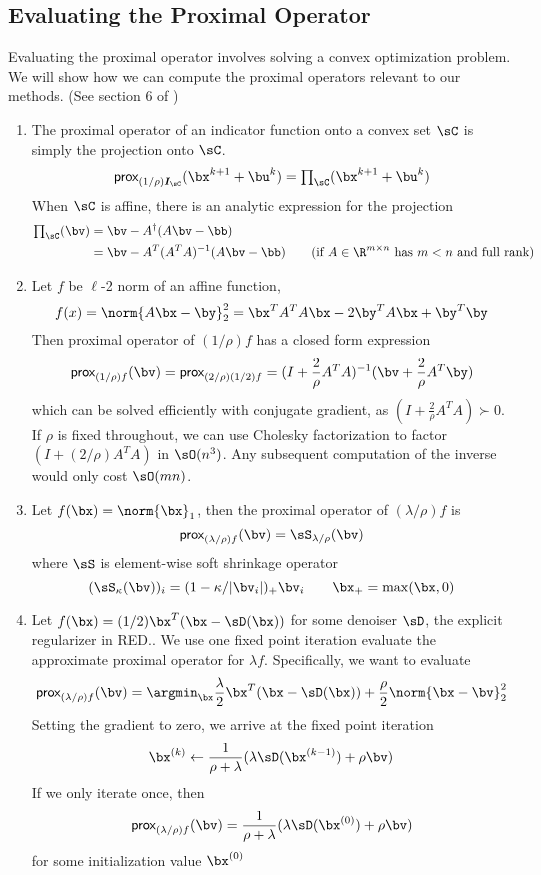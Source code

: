 \documentclass[11pt]{article}
\renewcommand{\sI}{\boldsymbol{I}}
\newcommand{\prox}{\textsf{prox}}
\begin{document}
\subsection{Evaluating the Proximal Operator}

Evaluating the proximal operator involves solving a convex optimization problem. We will show how we can compute the proximal operators relevant to our methods. (See section 6 of \cite{parikhProximalAlgorithms2014}) 
\begin{enumerate}
    \item The proximal operator of an indicator function onto a convex set $\sC$ is simply the projection onto $\sC$. 
    \[
        \prox_{(1/\rho)\sI_{\sC}}(\bx^{k+1} + \bu^k) =  \textstyle\prod_{\sC}(\bx^{k+1}+\bu^k)
    \]
    When $\sC$ is affine, there is an analytic expression for the projection
    \begin{align*}
        \textstyle\prod_{\sC}(\bv) 
            &= \bv - A^{\dagger}(A\bv-\bb)  \\
            &= \bv - A^T(A^TA)^{-1}(A\bv-\bb) \tag{if $A\in\R^{m\times n}$ has $m<n$ and full rank}
    \end{align*}
    \item Let $f$ be $\ell$-2 norm of an affine function, 
    \[
        f(x) = \norm{A\bx-\by}_2^2 = \bx^TA^TA\bx - 2\by^TA\bx + \by^T\by
    \]
    Then proximal operator of $(1/\rho)f$ has a closed form expression
    \[
        \prox_{(1/\rho)f}(\bv) 
            = \prox_{(2/\rho)(1/2)f}
            = (I + \frac{2}{\rho}A^TA)^{-1} (\bv + \frac{2}{\rho}A^T \by)
    \]
    which can be solved efficiently with conjugate gradient, as $(I + \frac{2}{\rho} A^TA) \succ 0$. If $\rho$ is fixed throughout, we can use Cholesky factorization to factor $(I + (2/\rho)A^TA)$ in $\sO(n^3)$. Any subsequent computation of the inverse would only cost $\sO(mn)$.
    \item Let $f(\bx) = \norm{\bx}_1$, then the proximal operator of $(\lambda/\rho) f$ is
    \[
        \prox_{(\lambda/\rho)f}(\bv) 
            = \sS_{\lambda/\rho}(\bv)
    \]
    where $\sS$ is element-wise soft shrinkage operator
    \[
        (\sS_{\kappa}(\bv))_i
            = (1-\kappa/|\bv_i|)_{+}\bv_i
        \quad\quad
        \bx_{+} = \max(\bx,0)
    \]
    \item Let $f(\bx) = (1/2)\bx^T(\bx-\sD(\bx))$ for some denoiser $\sD$, the explicit regularizer in RED.\cite{romanoLittleEngineThat2016}. We use one fixed point iteration evaluate the approximate proximal operator for $\lambda f$. Specifically, we want to evaluate 
    \[
        \prox_{(\lambda/\rho)f} (\bv)
            = \argmin_{\bx} \frac{\lambda}{2}\bx^T(\bx-\sD(\bx)) + \frac{\rho}{2} \norm{\bx-\bv}_2^2
    \]
    Setting the gradient to zero, we arrive at the fixed point iteration
    \[
        \bx^{(k)} \leftarrow \frac{1}{\rho+\lambda}(
            \lambda \sD(\bx^{(k-1)}) + \rho \bv
        )
    \]
    If we only iterate once, then 
    \[
        \prox_{(\lambda/\rho)f} (\bv)
            = \frac{1}{\rho+\lambda}( \lambda \sD(\bx^{(0)}) + \rho \bv )
    \]
    for some initialization value $\bx^{(0)}$
\end{enumerate}





\newpage
\printbibliography
\end{document}
